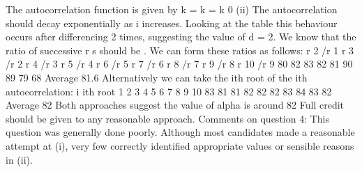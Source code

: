 \documentclass[a4paper,12pt]{article}
\begin{document}
The autocorrelation function is given by
k
=
k
=
k
0
(ii)
The autocorrelation should decay exponentially as i increases. Looking at the table this behaviour occurs after differencing 2 times, suggesting the value of d = 2.
We know that the ratio of successive r s should be . We can form these
ratios as follows:
r 2 /r 1
r 3 /r 2
r 4 /r 3
r 5 /r 4
r 6 /r 5
r 7 /r 6
r 8 /r 7
r 9 /r 8
r 10 /r 9 80%
82%
83%
82%
81%
90%
89%
79%
68%
Average 81.6%
Alternatively we can take the ith root of the ith autocorrelation:
i ith root
1
2
3
4
5
6
7
8
9
10 83%
81%
81%
82%
82%
82%
83%
84%
83%
82%
Average 82%
Both approaches suggest the value of alpha is around 82%
Full credit should be given to any reasonable approach.
Comments on question 4: This question was generally done poorly. Although most
candidates made a reasonable attempt at (i), very few correctly identified appropriate values
or sensible reasons in (ii).
\end{document}
